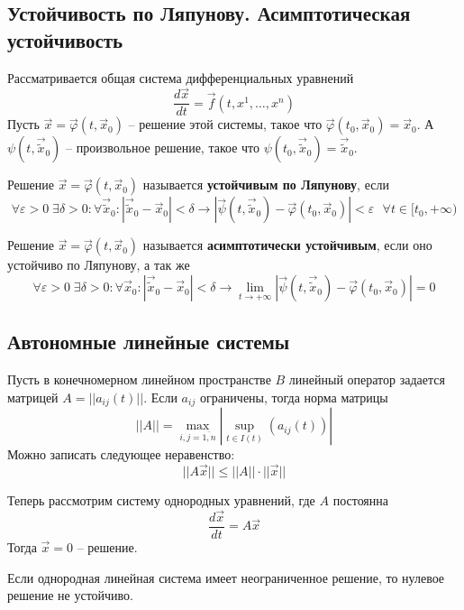 \subsection{Устойчивость по Ляпунову. Асимптотическая устойчивость}
Рассматривается общая система дифференциальных уравнений
\begin{equation}
	\frac{d\vec{x}}{dt} = \vec{f}(t, x^1, \dots, x^n)
\end{equation}
Пусть $\vec{x} = \vec{\varphi}(t, \vec{x}_0)$ -- решение этой системы, такое что $\vec{\varphi}(t_0, \vec{x}_0) = \vec{x}_0$. А $\psi(t, \vec{\tilde{x}}_0)$ -- произвольное решение, такое что $\psi(t_0, \vec{\tilde{x}}_0) = \vec{\tilde{x}}_0$.
\begin{definition}
	Решение $\vec{x} = \vec{\varphi}(t, \vec{x}_0)$ называется \textbf{устойчивым по Ляпунову}, если
	\[
	\forall \varepsilon > 0 \; \exists \delta > 0:\forall \vec{\tilde{x}}_0: |\vec{\tilde{x}}_0 - \vec{x}_0|<\delta \to |\vec{\psi}(t, \vec{\tilde{x}}_0) -  \vec{\varphi}(t_0, \vec{x}_0)|<\varepsilon\text{ } \forall t\in [t_0, +\infty)
	\]
\end{definition}

\begin{definition}
	Решение $\vec{x} = \vec{\varphi}(t, \vec{x}_0)$ называется \textbf{асимптотически устойчивым}, если оно устойчиво по Ляпунову, а так же
	\[
	\forall \varepsilon > 0 \; \exists \delta > 0:\forall \vec{x}_0: |\vec{\tilde{x}}_0 - \vec{x}_0|<\delta \to \lim_{t\to+\infty}|\vec{\psi}(t, \vec{\tilde{x}}_0) -  \vec{\varphi}(t_0, \vec{x}_0)|=0
	\]
\end{definition}

\subsection{Автономные линейные системы}

Пусть в конечномерном линейном пространстве $B$ линейный оператор задается матрицей $A=||a_{ij}(t)||$. Если $a_{ij}$ ограничены, тогда норма матрицы 
\[
||A|| = \max_{i,j =\overline{1,n}}|\sup_{t\in I(t)}(a_{ij}(t))|
\]
Можно записать следующее неравенство:
\[
||A\vec{x}||\leqslant ||A||\cdot||\vec{x}||
\]

Теперь рассмотрим систему однородных уравнений, где $A$ постоянна
\begin{equation}
	\frac{d\vec{x}}{dt} = A\vec{x}
	\label{equ:issue12sys}
\end{equation}
Тогда $\vec{x} = 0$ -- решение.

\begin{lemma}
	Если однородная линейная система имеет неограниченное решение, то нулевое решение не устойчиво.
\end{lemma}

